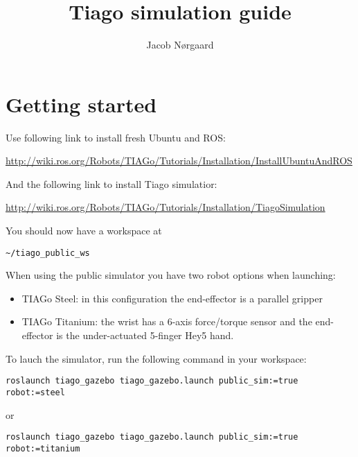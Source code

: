

\title{\textbf{Tiago simulation guide}}
\author{Jacob Nørgaard}
 


\begin{titlepage}
\clearpage\maketitle
\thispagestyle{empty}
\end{titlepage}

\section{Getting started}

Use following link to install fresh Ubuntu and ROS:

\url{http://wiki.ros.org/Robots/TIAGo/Tutorials/Installation/InstallUbuntuAndROS}

And the following link to install Tiago simulatior:

\url{http://wiki.ros.org/Robots/TIAGo/Tutorials/Installation/TiagoSimulation}

You should now have a workspace at 

\begin{verbatim}
~/tiago_public_ws
\end{verbatim}

When using the public simulator you have two robot options when launching:
    
\begin{itemize}
	\item TIAGo Steel: in this configuration the end-effector is a parallel gripper
    \item TIAGo Titanium: the wrist has a 6-axis force/torque sensor and the end-effector is the under-actuated 5-finger Hey5 hand.
\end{itemize}
    
To lauch the simulator, run the following command in your workspace:
\begin{verbatim}
roslaunch tiago_gazebo tiago_gazebo.launch public_sim:=true robot:=steel
\end{verbatim}

or
\begin{verbatim}
roslaunch tiago_gazebo tiago_gazebo.launch public_sim:=true robot:=titanium
\end{verbatim} 

